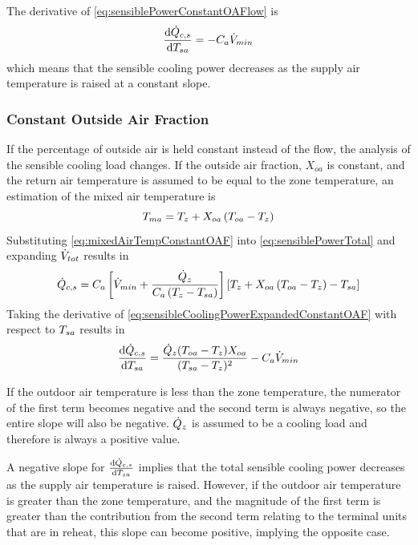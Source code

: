 The derivative of  \ref{eq:sensiblePowerConstantOAFlow} is
\begin{equation}
    \dv{\dot{Q}_{c,s}}{T_{sa}{}} = -C_{a} \dot{V}_{min} 
\end{equation}
which means that the sensible cooling power decreases as the supply air
temperature is raised at a constant slope. 


\subsubsection{Constant Outside Air Fraction}

If the percentage of outside air is held constant instead of the flow,
the analysis of the sensible cooling load changes. If the outside air
fraction, \(X_{oa}\) is constant, and the return air temperature is assumed to be
equal to the zone temperature, an estimation of the mixed air temperature is
\begin{equation}\label{eq:mixedAirTempConstantOAF}
    T_{ma}{} = T_{z} + X_{oa} \left(T_{oa}{} - T_{z}\right)
\end{equation}
Substituting  \ref{eq:mixedAirTempConstantOAF} into
\ref{eq:sensiblePowerTotal} and expanding \(\dot{V}_{tot}\) results in
\begin{equation}\label{eq:sensibleCoolingPowerExpandedConstantOAF}
    \dot{Q}_{c,s} = C_{a} \left[ \dot{V}_{min} + \frac{\dot{Q}_{z}}{C_{a}\left(T_{z}-T_{sa}{}\right)}{} \right] \left[ T_{z} + X_{oa} \left(T_{oa}{} - T_{z}\right) - T_{sa}{}  \right]
\end{equation}
Taking the derivative of 
\ref{eq:sensibleCoolingPowerExpandedConstantOAF} with respect to
\(T_{sa}{}\) results in
\begin{equation}\label{eq:firstDerivativeSensible}
    \dv{\dot{Q}_{c,s}}{T_{sa}{}} = \frac{\dot{Q}_{z} (T_{oa}{}-T_{z})
    X_{oa}}{(T_{sa}{}-T_{z})^2}-C_{a} \dot{V}_{min}
\end{equation}

If the outdoor air temperature is less than the zone temperature, the
numerator of the first term becomes negative and the second term is
always negative, so the entire slope will also be negative.
\(\dot{Q}_{z}\) is assumed to be a cooling load and therefore is
always a positive value. 

A negative slope for \(\dv{\dot{Q}_{c,s}}{T_{sa}{}}\) implies that the
total sensible cooling power decreases as the supply air temperature is
raised. However, if the outdoor air temperature is greater than the zone
temperature, and the magnitude of the first term is greater than the
contribution from the second term relating to the terminal units that
are in reheat, this slope can become positive, implying the opposite
case. 

